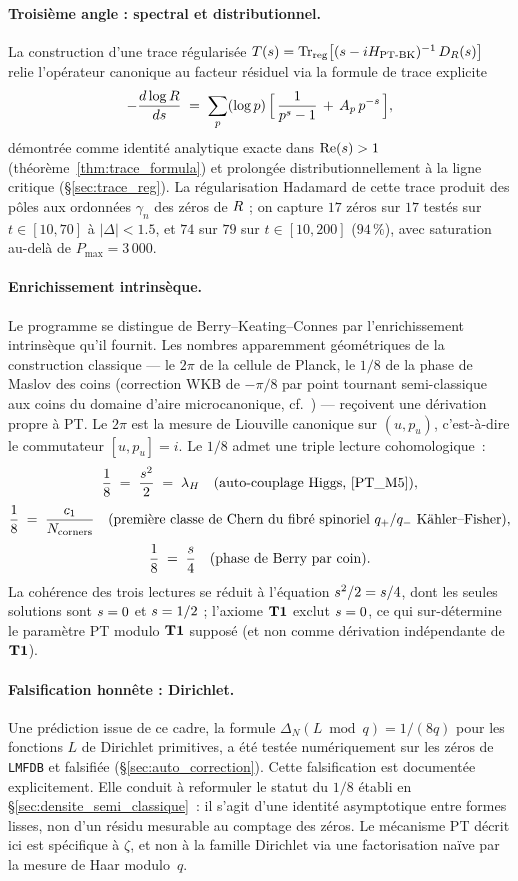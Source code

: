 \paragraph{Troisième angle : spectral et distributionnel.}
La construction d'une trace régularisée
$T(s) = \operatorname{Tr}_{\mathrm{reg}}\!\big[(s - iH_{\mathrm{PT\text{-}BK}})^{-1}\,D_R(s)\big]$
relie l'opérateur canonique au facteur résiduel via la formule de trace
explicite
\[
-\dfrac{d \log R}{ds} \;=\; \sum_{p} (\log p)\,\Big[\,\dfrac{1}{p^s - 1} \,+\, A_p\,p^{-s}\,\Big],
\]
démontrée comme identité analytique exacte dans $\operatorname{Re}(s) > 1$
(théorème~\ref{thm:trace_formula}) et prolongée distributionnellement à la
ligne critique (\S\ref{sec:trace_reg}). La régularisation Hadamard de
cette trace produit des pôles aux ordonnées $\gamma_n$ des zéros de
$R$ ; on capture $17$ zéros sur $17$ testés sur $t \in [10, 70]$ à
$|\Delta| < 1.5$, et $74$ sur $79$ sur $t \in [10, 200]$ ($94\,\%$), avec
saturation au-delà de $P_{\max} = 3\,000$.

\paragraph{Enrichissement intrinsèque.}
Le programme se distingue de Berry--Keating--Connes par l'enrichissement
intrinsèque qu'il fournit. Les nombres apparemment géométriques de la
construction classique --- le $2\pi$ de la cellule de Planck, le $1/8$ de
la phase de Maslov des coins (correction WKB de $-\pi/8$ par point
tournant semi-classique aux coins du domaine d'aire microcanonique,
cf.~\cite[\S 3]{BerryKeating1999}) --- reçoivent une dérivation propre à
PT. Le $2\pi$ est la mesure de Liouville canonique sur $(u, p_u)$,
c'est-à-dire le commutateur $[u, p_u] = i$. Le $1/8$ admet une triple
lecture cohomologique~:
\[
\dfrac{1}{8}
\;=\; \dfrac{s^{2}}{2} \;=\; \lambda_H
\quad\text{(auto-couplage Higgs, \cite{PT_M5})},
\]
\[
\dfrac{1}{8}
\;=\; \dfrac{c_1}{N_{\mathrm{corners}}}
\quad\text{(premi\`ere classe de Chern du fibr\'e spinoriel $q_{+}/q_{-}$ K\"ahler--Fisher)},
\]
\[
\dfrac{1}{8} \;=\; \dfrac{s}{4}
\quad\text{(phase de Berry par coin)}.
\]
La cohérence des trois lectures se réduit à l'équation
$s^{2}/2 = s/4$, dont les seules solutions sont $s = 0$ et
$s = 1/2$ ; l'axiome $\textbf{T1}$ exclut $s = 0$, ce qui sur-détermine
le paramètre PT modulo $\textbf{T1}$ supposé (et non comme dérivation
indépendante de $\textbf{T1}$).

\paragraph{Falsification honnête : Dirichlet.}
Une prédiction issue de ce cadre, la formule
$\Delta_N(L \bmod q) = 1/(8q)$ pour les fonctions $L$ de Dirichlet
primitives, a été testée numériquement sur les zéros de \texttt{LMFDB} et
falsifiée (\S\ref{sec:auto_correction}). Cette falsification est
documentée explicitement. Elle conduit à reformuler le statut du $1/8$
établi en \S\ref{sec:densite_semi_classique}~: il s'agit d'une identité
asymptotique entre formes lisses, non d'un résidu mesurable au comptage
des zéros. Le mécanisme PT décrit ici est spécifique à $\zeta$, et non à
la famille Dirichlet via une factorisation naïve par la mesure de Haar
modulo~$q$.

